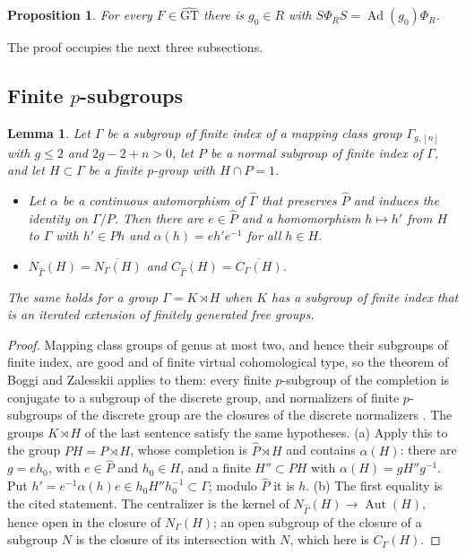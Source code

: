\documentclass[11pt,a4paper]{article}
\theoremstyle{plain}
\newtheorem{lemma}[theorem]{Lemma}
\newtheorem{proposition}[theorem]{Proposition}
\theoremstyle{definition}
\theoremstyle{remark}
\newcommand{\GT}{\widehat{\mathrm{GT}}}
\newcommand{\Ad}{\operatorname{Ad}}
\newcommand{\Aut}{\operatorname{Aut}}
\begin{document}
\begin{proposition}\label{prop:swap}
For every $F\in\GT$ there is $g_0\in R$ with $S\Phi_RS=\Ad(g_0)\Phi_R$.
\end{proposition}

The proof occupies the next three subsections.

\subsection*{Finite $p$-subgroups}
\begin{lemma}\label{lem:BZ}
Let $\Gamma$ be a subgroup of finite index of a mapping class group $\Gamma_{g,[n]}$ with $g\le2$ and $2g-2+n>0$,
let $P$ be a normal subgroup of finite index of $\Gamma$, and let $H\subset\Gamma$ be a finite $p$-group with
$H\cap P=1$.
\begin{itemize}
\item[(a)] Let $\alpha$ be a continuous automorphism of $\widehat\Gamma$ that preserves $\widehat P$ and induces the
identity on $\Gamma/P$. Then there are $e\in\widehat P$ and a homomorphism $h\mapsto h'$ from $H$ to $\Gamma$ with
$h'\in Ph$ and $\alpha(h)=eh'e^{-1}$ for all $h\in H$.
\item[(b)] $N_{\widehat\Gamma}(H)=\overline{N_\Gamma(H)}$ and $C_{\widehat\Gamma}(H)=\overline{C_\Gamma(H)}$.
\end{itemize}
The same holds for a group $\Gamma=K\rtimes H$ when $K$ has a subgroup of finite index that is an iterated
extension of finitely generated free groups.
\end{lemma}

\begin{proof}
Mapping class groups of genus at most two, and hence their subgroups of finite index, are good and of finite
virtual cohomological type, so the theorem of Boggi and Zalesskii applies to them: every finite $p$-subgroup of the
completion is conjugate to a subgroup of the discrete group, and normalizers of finite $p$-subgroups of the
discrete group are the closures of the discrete normalizers \cite[Theorem A and the theorem on hyperelliptic
mapping class groups of the last section]{BZ}. The groups $K\rtimes H$ of the last sentence satisfy the same
hypotheses. (a) Apply this to the group $PH=P\rtimes H$, whose completion is $\widehat P\rtimes H$ and contains
$\alpha(H)$: there are $g=e h_0$, with $e\in\widehat P$ and $h_0\in H$, and a finite $H''\subset PH$ with
$\alpha(H)=gH''g^{-1}$. Put $h'=e^{-1}\alpha(h)e\in h_0H''h_0^{-1}\subset\Gamma$; modulo $\widehat P$ it is $h$.
(b) The first equality is the cited statement. The centralizer is the kernel of
$N_{\widehat\Gamma}(H)\to\Aut(H)$, hence open in the closure of $N_\Gamma(H)$; an open subgroup of the closure of a
subgroup $N$ is the closure of its intersection with $N$, which here is $C_\Gamma(H)$.
\end{proof}
\end{document}
